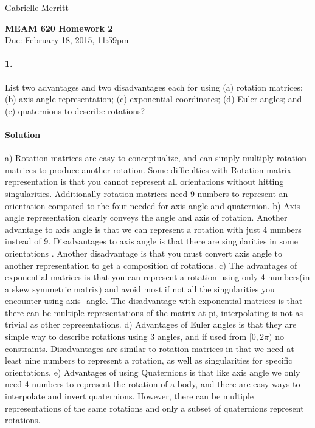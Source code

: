 \documentclass[english]{article}
\begin{document}
Gabrielle Merritt
\begin{center}
{\textbf{MEAM 620 Homework 2}} \\
Due: February 18, 2015, 11:59pm
\end{center}


\paragraph{1.} List two advantages and two disadvantages each for using (a) rotation matrices;(b) axis angle representation; (c) exponential coordinates; (d) Euler angles; and (e) quaternions to describe rotations? 
\paragraph{Solution}
a)  Rotation matrices are easy to conceptualize, and can simply multiply rotation matrices to produce another rotation. Some difficulties with Rotation matrix representation is that you cannot represent all orientations without hitting singularities. Additionally rotation matrices need 9 numbers to represent an orientation  compared to the four needed for  axis angle and quaternion. 
\linebreak
b) Axis angle representation clearly conveys the angle and axis of rotation. Another advantage to axis angle is that we can represent a rotation with just 4 numbers instead of 9. Disadvantages to axis angle is that there are singularities in some orientations . Another disadvantage is that you must convert axis angle to another representation to get a composition of rotations. 
\linebreak
c) The advantages of exponential matrices is that you can represent a rotation using only 4 numbers(in a skew symmetric matrix) and avoid most if not all the singularities you encounter using axis -angle. The disadvantage with exponential matrices is that there can be multiple representations of the matrix at pi, interpolating is not as trivial as other representations. 
\linebreak
d) Advantages of Euler angles is that they are simple way to describe rotations using 3 angles, and if used from $[0 , 2\pi) $ no constraints. Disadvantages are similar to rotation matrices in that we need at least nine numbers to represent a rotation, as well as singularities for specific orientations.
\linebreak
e) Advantages of using Quaternions is that like axis angle we only need 4 numbers to represent the rotation of a body, and there are easy ways to interpolate and invert quaternions. However, there can be multiple representations of the same rotations and only a subset of quaternions represent rotations.
\\
\end{document}
